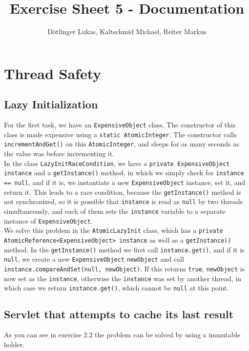\documentclass{article}
\title{Exercise Sheet 5 - Documentation}
\date{}
\author{Dötlinger Lukas, Kaltschmid Michael, Reiter Markus}
\begin{document}
  \RaggedRight

  \maketitle

  \section{Thread Safety}

    \subsection{Lazy Initialization}

    For the first task, we have an \texttt{ExpensiveObject} class. The constructor of this class is made expensive using a \texttt{static AtomicInteger}. The constructor calls \texttt{incrementAndGet()} on this \texttt{AtomicInteger}, and sleeps for as many seconds as the value was before incrementing it.
    \\
    In the class \texttt{LazyInitRaceCondition}, we have a \texttt{private ExpensiveObject instance} and a \texttt{getInstance()} method, in which we simply check for \texttt{instance == null}, and if it is, we instantiate a new \texttt{ExpensiveObject} instance, set it, and return it. This leads to a race condition, because the \texttt{getInstance()} method is not synchronized, so it is possible that \texttt{instance} is read as \texttt{null} by two threads simultaneously, and each of them sets the \texttt{instance} variable to a separate instance of \texttt{ExpensiveObject}.
    \\
    We solve this problem in the \texttt{AtomicLazyInit} class, which has a \texttt{private AtomicReference<ExpensiveObject> instance} as well as a \texttt{getInstance()} method. In the \texttt{getInstance()} method we first call \texttt{instance.get()}, and if it is \texttt{null}, we create a new \texttt{ExpensiveObject} \texttt{newObject} and call \\ \texttt{instance.compareAndSet(null, newObject)}. If this returns \texttt{true}, \texttt{newObject} is now set as the \texttt{instance}, otherwise the \texttt{instance} was set by another thread, in which case we return \texttt{instance.get()}, which cannot be \texttt{null} at this point.

    \subsection{Servlet that attempts to cache its last result}
    As you can see in exercise 2.2 the problem can be solved by using a immutable holder.
\end{document}
